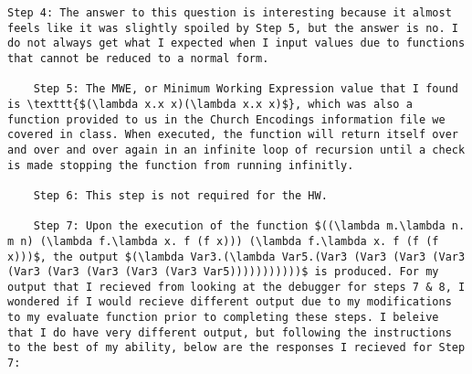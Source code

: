 \documentclass{article}
\theoremstyle{theorem}
\theoremstyle{definition}
\theoremstyle{remark}
\begin{document}
\begin{lstlisting}[mathescape=true]
    Step 4: The answer to this question is interesting because it almost feels like it was slightly spoiled by Step 5, but the answer is no. I do not always get what I expected when I input values due to functions that cannot be reduced to a normal form.
  
    Step 5: The MWE, or Minimum Working Expression value that I found is \texttt{$(\lambda x.x x)(\lambda x.x x)$}, which was also a function provided to us in the Church Encodings information file we covered in class. When executed, the function will return itself over and over and over again in an infinite loop of recursion until a check is made stopping the function from running infinitly.
  
    Step 6: This step is not required for the HW.
  
    Step 7: Upon the execution of the function $((\lambda m.\lambda n. m n) (\lambda f.\lambda x. f (f x))) (\lambda f.\lambda x. f (f (f x)))$, the output $(\lambda Var3.(\lambda Var5.(Var3 (Var3 (Var3 (Var3 (Var3 (Var3 (Var3 (Var3 (Var3 Var5)))))))))))$ is produced. For my output that I recieved from looking at the debugger for steps 7 & 8, I wondered if I would recieve different output due to my modifications to my evaluate function prior to completing these steps. I beleive that I do have very different output, but following the instructions to the best of my ability, below are the responses I recieved for Step 7:
  \end{lstlisting}
 
\end{document}
